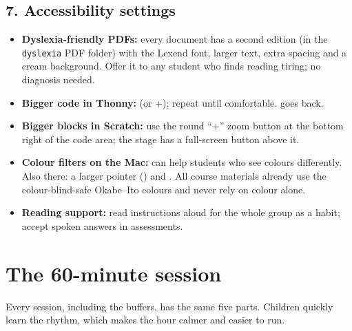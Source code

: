 \documentclass[level=1,teacher]{kidscode}
\begin{document}
\subsection{7. Accessibility settings}
\begin{itemize}[itemsep=3pt]
  \item \textbf{Dyslexia-friendly PDFs:} every document has a second edition (in the \texttt{dyslexia}
        PDF folder) with the Lexend font, larger text, extra spacing and a cream background. Offer it to any
        student who finds reading tiring; no diagnosis needed.
  \item \textbf{Bigger code in Thonny:}  (or +\keys{+}); repeat
        until comfortable.  goes back.
  \item \textbf{Bigger blocks in Scratch:} use the round \enquote{+} zoom button at the bottom right of the
        code area; the stage has a full-screen button above it.
  \item \textbf{Colour filters on the Mac:} 
        can help students who see colours differently. Also there: a larger pointer
        () and . All course materials already use the colour-blind-safe
        Okabe--Ito colours and never rely on colour alone.
  \item \textbf{Reading support:} read instructions aloud for the whole group as a habit; accept spoken
        answers in assessments.
\end{itemize}

\section{The 60-minute session}
Every session, including the buffers, has the same five parts. Children quickly learn the rhythm, which
makes the hour calmer and easier to run.

\begin{timeplan}
\end{timeplan}
\end{document}
